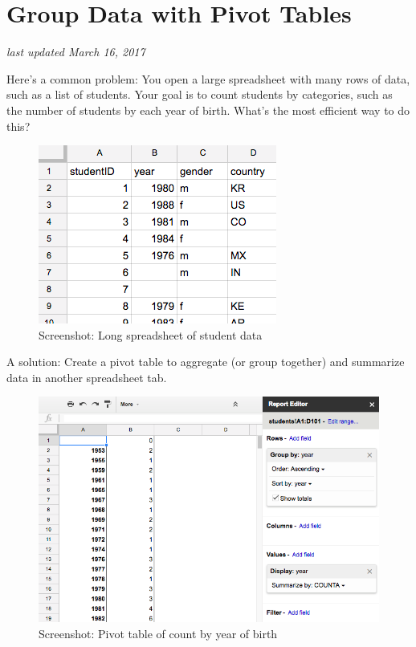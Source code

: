 \documentclass[
  english,
]{book}
\begin{document}
\hypertarget{pivot}{%
\section{Group Data with Pivot Tables}\label{pivot}}

\emph{last updated March 16, 2017}

Here's a common problem: You open a large spreadsheet with many rows of data, such as a list of students. Your goal is to count students by categories, such as the number of students by each year of birth. What's the most efficient way to do this?

\begin{figure}
\centering
\includegraphics{images/02-spreadsheet/spreadsheet-pivot-intro.png}
\caption{Screenshot: Long spreadsheet of student data}
\end{figure}

A solution: Create a pivot table to aggregate (or group together) and summarize data in another spreadsheet tab.

\begin{figure}
\centering
\includegraphics{images/02-spreadsheet/spreadsheet-google-pivot-year.png}
\caption{Screenshot: Pivot table of count by year of birth}
\end{figure}
\end{document}
